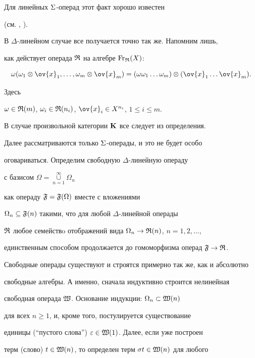 \begin{pf}


Для линейных $\sym$-операд этот факт хорошо известен


(см. \cite{T}, \cite{GK}).


В $\Delta$-линейном случае все получается точно так же. Напомним лишь,


как действует операда $\R$ на алгебре $\Fr_{\R}(X)$:


$$


\o(\o_1\otimes \ov{x}_1, \dotsc, \o_m\otimes \ov{x}_m)=


(\o\o_1\dotsc \o_m)\otimes (\ov{x}_1\dotsc \ov{x}_m).


$$


Здесь


$\o\in \R(m)$, $\o_i\in\R(n_i)$, $\ov{x}_i\in X^{n_i}$, $1\le i \le m$.


В случае произвольной категории $\P$ все следует из определения.


\end{pf}





Далее рассматриваются только $\sym$-операды, и это не будет особо


оговариваться. Определим свободную $\Delta$-линейную операду


с базисом $\Omega=\mathop{\cup}\limits_{n=1}^{\infty} \Omega_n$


как операду $\F=\F(\Omega)$ вместе с вложениями


$\Omega_n\subseteq \F(n)$ такими, что для любой $\Delta$-линейной операды


$\R$ любое семействo отображений вида $\Omega_n\to \R(n)$, $n=1,2,\dotsc$,


единственным способом продолжается до гомоморфизма операд $\F\to \R$.


Свободные операды существуют и строятся примерно так же, как и абсолютно


свободные алгебры. А именно, сначала индуктивно строится нелинейная


свободная операда $\W$. Основание индукции: $\Omega_n \subset \W(n)$


для всех $n\ge 1$, и, кроме того, постулируется существование


единицы (``пустого слова'') $\ep\in \W(1)$. Далее, если уже построен


терм (слово) $t\in \W(n)$, то определен терм $\s t\in \W(n)$ для любого


